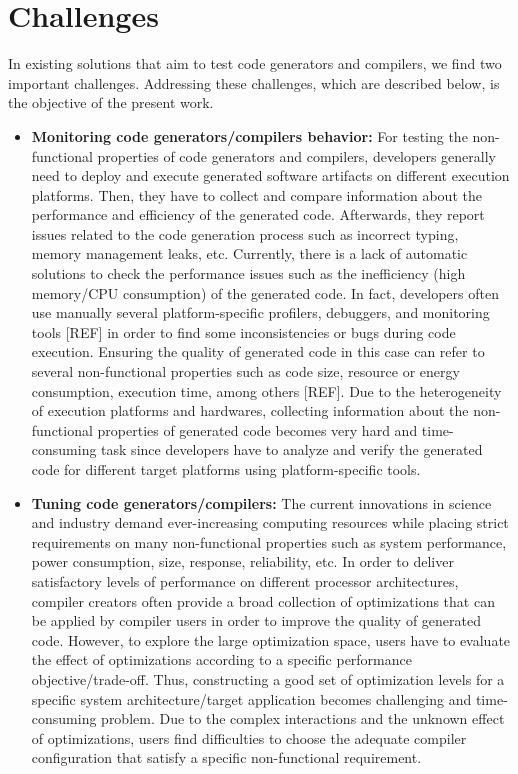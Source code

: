 \section*{Challenges}
In existing solutions that aim to test code generators and compilers, we find two important challenges. Addressing these challenges, which are described below, is the objective of the present work.
\begin{itemize}
\item
\textbf{Monitoring code generators/compilers behavior:} For testing the non-functional properties of code generators and compilers, developers generally need to deploy and execute generated software artifacts on different execution platforms. Then, they have to collect and compare information about the performance and efficiency of the generated code. Afterwards, they report issues related to the code generation process such as incorrect typing, memory management leaks, etc. Currently, there is a lack of automatic solutions to check the performance issues such as the inefficiency (high memory/CPU consumption) of the generated code. In fact, developers often use manually several platform-specific profilers, debuggers, and monitoring tools [REF] in order to find some inconsistencies or bugs during code execution. Ensuring the quality of generated code in this case can refer to several non-functional properties such as code size, resource or energy consumption, execution time, among others [REF]. Due to the heterogeneity of execution platforms and hardwares, collecting information about the non-functional properties of generated code becomes very hard and time-consuming task since developers have to analyze and verify the generated code for different target platforms using platform-specific tools.
\item
\textbf{Tuning code generators/compilers:} The current innovations in science and industry demand ever-increasing computing resources while placing strict requirements on many non-functional properties such as system performance, power consumption, size, response, reliability, etc. In order to deliver satisfactory levels of performance on different processor architectures, compiler creators often provide a broad collection of optimizations that can be applied by compiler users in order to improve the quality of generated code. However, to explore the large optimization space, users have to evaluate the effect of optimizations according to a specific performance objective/trade-off. Thus, constructing a good set of optimization levels for a specific system architecture/target application becomes challenging and time-consuming problem. Due to the complex interactions and the unknown effect of optimizations, users find difficulties to choose the adequate compiler configuration that satisfy a specific non-functional requirement.





 


\end{itemize}
